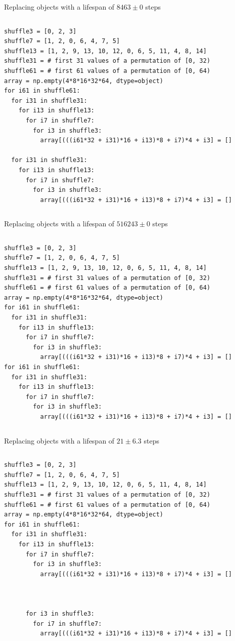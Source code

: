 \documentclass[aspectratio=169]{beamer}
\begin{document}
\begin{frame}[fragile]{Replacing objects with a lifespan of $8463 \pm 0$ steps}
\small
\begin{columns}
\begin{verbatim}
shuffle3 = [0, 2, 3]
shuffle7 = [1, 2, 0, 6, 4, 7, 5]
shuffle13 = [1, 2, 9, 13, 10, 12, 0, 6, 5, 11, 4, 8, 14]
shuffle31 = # first 31 values of a permutation of [0, 32)
shuffle61 = # first 61 values of a permutation of [0, 64)
array = np.empty(4*8*16*32*64, dtype=object)
for i61 in shuffle61:
  for i31 in shuffle31:
    for i13 in shuffle13:
      for i7 in shuffle7:
        for i3 in shuffle3:
          array[(((i61*32 + i31)*16 + i13)*8 + i7)*4 + i3] = []

  for i31 in shuffle31:
    for i13 in shuffle13:
      for i7 in shuffle7:
        for i3 in shuffle3:
          array[(((i61*32 + i31)*16 + i13)*8 + i7)*4 + i3] = []
\end{verbatim}
\end{columns}
\end{frame}

\begin{frame}[fragile]{Replacing objects with a lifespan of $516243 \pm 0$ steps}
\small
\begin{columns}
\begin{verbatim}
shuffle3 = [0, 2, 3]
shuffle7 = [1, 2, 0, 6, 4, 7, 5]
shuffle13 = [1, 2, 9, 13, 10, 12, 0, 6, 5, 11, 4, 8, 14]
shuffle31 = # first 31 values of a permutation of [0, 32)
shuffle61 = # first 61 values of a permutation of [0, 64)
array = np.empty(4*8*16*32*64, dtype=object)
for i61 in shuffle61:
  for i31 in shuffle31:
    for i13 in shuffle13:
      for i7 in shuffle7:
        for i3 in shuffle3:
          array[(((i61*32 + i31)*16 + i13)*8 + i7)*4 + i3] = []
for i61 in shuffle61:
  for i31 in shuffle31:
    for i13 in shuffle13:
      for i7 in shuffle7:
        for i3 in shuffle3:
          array[(((i61*32 + i31)*16 + i13)*8 + i7)*4 + i3] = []
\end{verbatim}
\end{columns}
\end{frame}

\begin{frame}[fragile]{Replacing objects with a lifespan of $21 \pm 6.3$ steps}
\small
\begin{columns}
\begin{verbatim}
shuffle3 = [0, 2, 3]
shuffle7 = [1, 2, 0, 6, 4, 7, 5]
shuffle13 = [1, 2, 9, 13, 10, 12, 0, 6, 5, 11, 4, 8, 14]
shuffle31 = # first 31 values of a permutation of [0, 32)
shuffle61 = # first 61 values of a permutation of [0, 64)
array = np.empty(4*8*16*32*64, dtype=object)
for i61 in shuffle61:
  for i31 in shuffle31:
    for i13 in shuffle13:
      for i7 in shuffle7:
        for i3 in shuffle3:
          array[(((i61*32 + i31)*16 + i13)*8 + i7)*4 + i3] = []



      for i3 in shuffle3:
        for i7 in shuffle7:
          array[(((i61*32 + i31)*16 + i13)*8 + i7)*4 + i3] = []
\end{verbatim}
\end{columns}
\end{frame}
\end{document}
